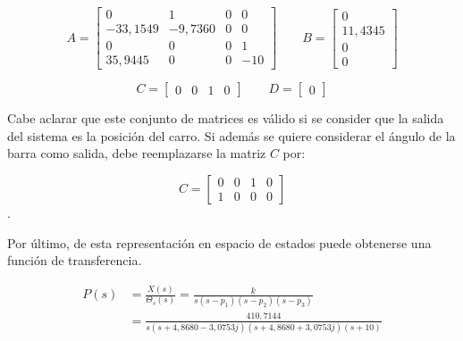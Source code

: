 \[
A=
\begin{bmatrix}
0 & 1 & 0 & 0 \\
-33,1549 & -9,7360 & 0 & 0 \\
0 & 0 & 0 & 1 \\
35,9445 & 0 & 0 & -10
\end{bmatrix}
\qquad
B=
\begin{bmatrix}
0 \\
11,4345 \\
0 \\
0
\end{bmatrix}
\]

\[
C=
\begin{bmatrix}
0 & 0 & 1 & 0
\end{bmatrix}
\qquad
D=
\begin{bmatrix}
0
\end{bmatrix}
\]

Cabe aclarar que este conjunto de matrices es válido si se consider que la salida del sistema es la posición del carro. Si además se quiere considerar el ángulo de la barra como salida, debe reemplazarse la matriz $C$ por: 

\[
C = \begin{bmatrix}
    0 & 0 & 1 & 0 \\
    1 & 0 & 0 & 0 
\end{bmatrix}
\]
.

Por último, de esta representación en espacio de estados puede obtenerse una función de transferencia.

\begin{equation}
\begin{aligned}
P(s) &= \frac{X(s)}{\Theta_s(s)}
      = \frac{k}{s(s-p_1)(s-p_2)(s-p_3)} \\
     &= \frac{410,7144}
{s\left(s+4,8680-3,0753j\right)\left(s+4,8680+3,0753j\right)(s+10)}
\end{aligned}
\end{equation}